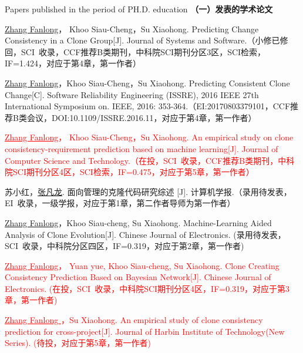 
 {Papers
published in the period of PH.D. education}
\noindent\textbf{（一）发表的学术论文}
\begin{publist}
\item
\underline{Zhang Fanlong}， Khoo Siau-Cheng，Su Xiaohong. Predicting Change Consistency in a Clone Group[J]. Journal of Systems and Software.（小修已修回，SCI~收录，CCF推荐B类期刊，中科院SCI期刊分区3区，SCI检索，IF=1.424，对应于第4章，第一作者）

\item
\underline{Zhang Fanlong}，Khoo Siau-Cheng，Su Xiaohong. Predicting Consistent Clone Change[C]. Software Reliability Engineering (ISSRE), 2016 IEEE 27th International Symposium on. IEEE, 2016: 353-364.（EI:20170803379101，CCF推荐B类会议，DOI:10.1109/ISSRE.2016.11，对应于第4章，第一作者）

\item
\textcolor{red}{\underline{Zhang Fanlong}， Khoo Siau-Cheng，Su Xiaohong. An empirical study on clone consistency-requirement prediction based on machine learning[J]. Journal of Computer Science and Technology.（在投，SCI~收录，CCF推荐B类期刊，中科院SCI期刊分区4区，SCI检索，IF=0.475，对应于第5章，第一作者）}

\item 
苏小红，\underline{张凡龙}. 面向管理的克隆代码研究综述 [J]. 计算机学报.（录用待发表，EI~收录，一级学报，对应于第1章，第二作者导师为第一作者）

\item
\underline{Zhang Fanlong}，Khoo Siau-cheng, Su Xiaohong. Machine-Learning Aided Analysis of Clone Evolution[J]. Chinese Journal of Electronics. (录用待发表，SCI~收录，中科院分区四区，IF=0.319，对应于第2章，第一作者)

\item
\textcolor{red}{\underline{Zhang Fanlong}， Yuan yue, Khoo Siau-cheng, Su Xiaohong. Clone Creating Consistency Prediction Based on Bayesian Network[J]. Chinese Journal of Electronics. (在投，SCI~收录，中科院SCI期刊分区4区，IF=0.319，对应于第3章，第一作者)}

\item
\textcolor{red}{\underline{Zhang Fanlong }，Su Xiaohong. An empirical study of clone consistency prediction for cross-project[J]. Journal of Harbin Institute of Technology(New Series). (待投，对应于第5章，第一作者)}


\end{publist}
